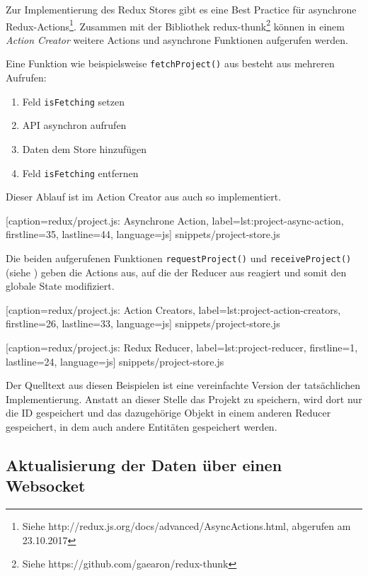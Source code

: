 Zur Implementierung des Redux Stores gibt es eine Best Practice für asynchrone Redux-Actions\footnote{Siehe http://redux.js.org/docs/advanced/AsyncActions.html, abgerufen am 23.10.2017}. Zusammen mit der Bibliothek redux-thunk\footnote{Siehe https://github.com/gaearon/redux-thunk} können in einem \emph{Action Creator} weitere Actions und asynchrone Funktionen aufgerufen werden.

Eine Funktion wie beispielsweise \texttt{fetchProject()} aus  besteht aus mehreren Aufrufen:

\begin{enumerate}
 \item Feld \texttt{isFetching} setzen
 \item API asynchron aufrufen
 \item Daten dem Store hinzufügen
 \item Feld \texttt{isFetching} entfernen
\end{enumerate}

Dieser Ablauf ist im Action Creator aus  auch so implementiert.


  [caption={redux/project.js: Asynchrone Action},
  label={lst:project-async-action},
  firstline=35,
  lastline=44,
  language=js]
  {snippets/project-store.js}

Die beiden aufgerufenen Funktionen \texttt{requestProject()} und \texttt{receiveProject()} (siehe ) geben die Actions aus, auf die der Reducer aus  reagiert und somit den globale State modifiziert.


  [caption={redux/project.js: Action Creators},
  label={lst:project-action-creators},
  firstline=26,
  lastline=33,
  language=js]
  {snippets/project-store.js}


  [caption={redux/project.js: Redux Reducer},
  label={lst:project-reducer},
  firstline=1,
  lastline=24,
  language=js]
  {snippets/project-store.js}

Der Quelltext aus diesen Beispielen ist eine vereinfachte Version der tat\-säch\-lich\-en Implementierung. Anstatt an dieser Stelle das Projekt zu speichern, wird dort nur die ID gespeichert und das dazugehörige Objekt in einem anderen Reducer gespeichert, in dem auch andere Entitäten gespeichert werden.


\subsection{Aktualisierung der Daten über einen Websocket}

